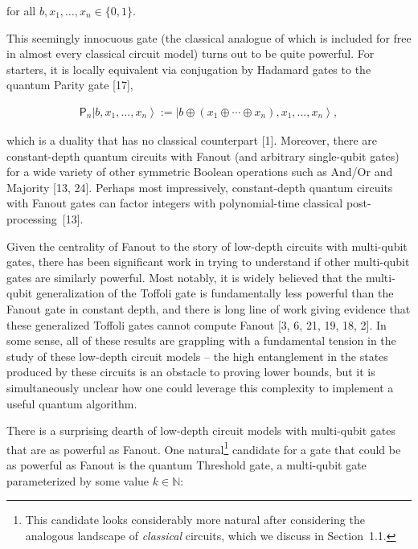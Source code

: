 \documentclass[10pt,a4paper]{article}
\begin{document}
for all $b,x_{1},\ldots,x_{n}\in\{0,1\}$.\par




This seemingly innocuous gate (the classical analogue of which is included for free in almost every classical circuit model) turns out to be quite powerful. For starters, it is locally equivalent via conjugation by Hadamard gates to the quantum Parity gate [17],\par


\[\begin{gathered}
\mathsf{P}_{n}\left|b,x_{1},\ldots,x_{n}\right\rangle:=\left|b\oplus(x_{1}\oplus\cdots\oplus x_{n}),x_{1},\ldots,x_{n}\right\rangle,
\end{gathered}\]


which is a duality that has no classical counterpart [1]. Moreover, there are constant-depth quantum circuits with Fanout (and arbitrary single-qubit gates) for a wide variety of other symmetric Boolean operations such as And/Or and Majority [13, 24]. Perhaps most impressively, constant-depth quantum circuits with Fanout gates can factor integers with polynomial-time classical post-processing [13].\par




Given the centrality of Fanout to the story of low-depth circuits with multi-qubit gates, there has been significant work in trying to understand if other multi-qubit gates are similarly powerful. Most notably, it is widely believed that the multi-qubit generalization of the Toffoli gate is fundamentally less powerful than the Fanout gate in constant depth, and there is long line of work giving evidence that these generalized Toffoli gates cannot compute Fanout [3, 6, 21, 19, 18, 2]. In some sense, all of these results are grappling with a fundamental tension in the study of these low-depth circuit models – the high entanglement in the states produced by these circuits is an obstacle to proving lower bounds, but it is simultaneously unclear how one could leverage this complexity to implement a useful quantum algorithm.\par




There is a surprising dearth of low-depth circuit models with multi-qubit gates that are as powerful as Fanout. One natural\footnote{This candidate looks considerably more natural after considering the analogous landscape of \emph{classical} circuits, which we discuss in Section 1.1.} candidate for a gate that could be as powerful as Fanout is the quantum Threshold gate, a multi-qubit gate parameterized by some value $k\in\mathbb{N}$:\par
\end{document}
